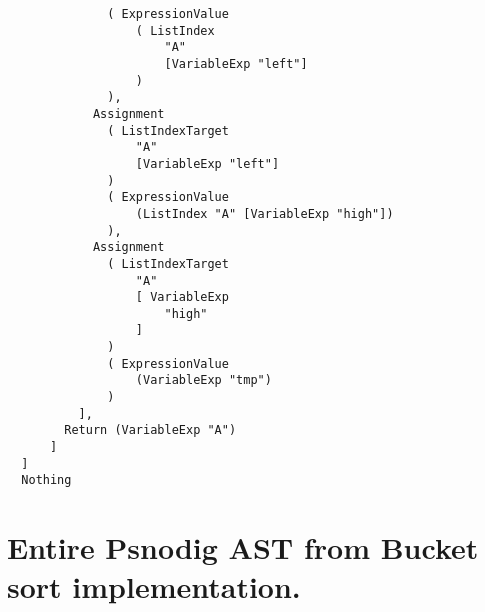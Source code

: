 \begin{lstlisting}
              ( ExpressionValue
                  ( ListIndex
                      "A"
                      [VariableExp "left"]
                  )
              ),
            Assignment
              ( ListIndexTarget
                  "A"
                  [VariableExp "left"]
              )
              ( ExpressionValue
                  (ListIndex "A" [VariableExp "high"])
              ),
            Assignment
              ( ListIndexTarget
                  "A"
                  [ VariableExp
                      "high"
                  ]
              )
              ( ExpressionValue
                  (VariableExp "tmp")
              )
          ],
        Return (VariableExp "A")
      ]
  ]
  Nothing
\end{lstlisting}

\section{Entire Psnodig AST from Bucket sort implementation.}
\label{appendix:Entire Psnodig AST from Bucket sort implementation.}

